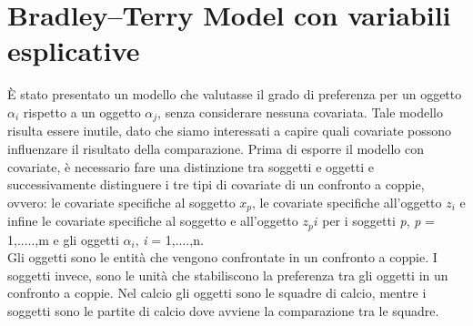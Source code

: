 \section{Bradley–Terry Model con variabili esplicative}
È stato presentato un modello che valutasse il grado di preferenza per un oggetto $\alpha_{i}$ rispetto a un oggetto $\alpha_{j}$, senza considerare nessuna covariata. Tale modello risulta essere inutile, dato che siamo interessati a capire quali covariate possono influenzare il risultato della comparazione. Prima di esporre il modello con covariate, è necessario fare una distinzione tra soggetti e oggetti e successivamente distinguere i tre tipi di covariate di un confronto a coppie, ovvero: le covariate specifiche al soggetto $x_p$, le covariate specifiche all'oggetto $z_i$ e infine le covariate specifiche al soggetto e all'oggetto $z_pi$ per i soggetti \emph{p}, \emph{p} = 1,.....,m e gli oggetti $\alpha_{i}$, \emph{i} = 1,....,n.\\
Gli oggetti sono le entità che vengono confrontate in un confronto a coppie. I soggetti invece, sono le unità che stabiliscono la preferenza tra gli oggetti in un confronto a coppie. Nel calcio gli oggetti sono le squadre di calcio, mentre i soggetti sono le partite di calcio dove avviene la comparazione tra le squadre.\\

